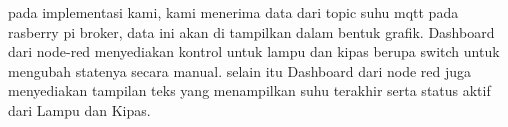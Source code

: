 pada implementasi kami, kami menerima data dari topic suhu mqtt pada rasberry pi broker, data ini akan di tampilkan dalam bentuk grafik. Dashboard dari node-red menyediakan kontrol untuk lampu dan kipas berupa switch untuk mengubah statenya secara manual. selain itu Dashboard dari node red juga menyediakan tampilan teks yang menampilkan suhu terakhir serta status aktif dari Lampu dan Kipas.